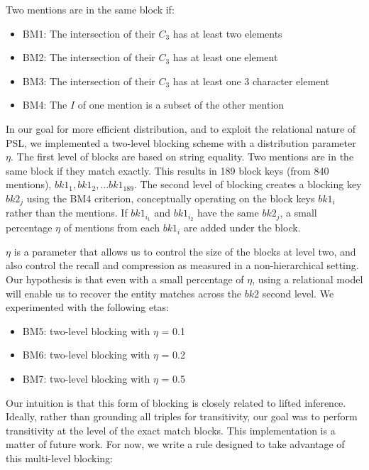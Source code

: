\documentclass{article}
\begin{document}
            Two mentions are in the same block if:
            
            \begin{itemize}
                \item BM1: The intersection of their $C_3$ has at least two elements
                \item BM2: The intersection of their $C_3$ has at least one element
                \item BM3: The intersection of their $C_3$ has at least one 3 character element
                \item BM4: The $I$ of one mention is a subset of the other mention
            \end{itemize}
            
            In our goal for more efficient distribution, and to exploit the relational nature of PSL, we implemented a two-level blocking scheme with a distribution parameter $\eta$. The first level of blocks are based on string equality. Two mentions are in the same block if they match exactly. This results in 189 block keys (from 840 mentions), $bk1_1, bk1_2, ... bk1_{189}$. The second level of blocking creates a blocking key $bk2_j$ using the BM4 criterion, conceptually operating on the block keys $bk1_i$ rather than the mentions. If $bk1_{i_1}$ and $bk1_{i_2}$ have the same $bk2_j$, a small percentage $\eta$ of mentions from each $bk1_i$ are added under the block.

            $\eta$ is a parameter that allows us to control the size of the blocks at level two, and also control the recall and compression as measured in a non-hierarchical setting. Our hypothesis is that even with a small percentage of $\eta$, using a relational model will enable us to recover the entity matches across the $bk2$ second level. We experimented with the following etas:
            
            \begin{itemize}
                \item BM5: two-level blocking with $\eta$ = 0.1
                \item BM6: two-level blocking with $\eta$ = 0.2
                \item BM7: two-level blocking with $\eta$ = 0.5
            \end{itemize}
            
            Our intuition is that this form of blocking is closely related to lifted inference. Ideally, rather than grounding all triples for transitivity, our goal was to perform transitivity at the level of the exact match blocks. This implementation is a matter of future work. For now, we write a rule designed to take advantage of this multi-level blocking:
            
\end{document}
